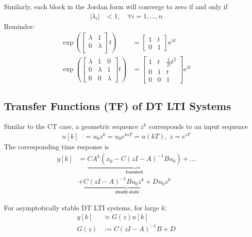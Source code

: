 Similarly, each block in the Jordan form will converge to zero if and only if
\noindent\begin{align*}
    |\lambda_i| & <1,\quad\forall i=1,\ldots,n
\end{align*}
Reminder:
\noindent\begin{align*}
    \left.\exp\left(\begin{bmatrix}\lambda&1\\ 0&\lambda\\\end{bmatrix}\right.t\right)               & =\begin{bmatrix}1&t\\0&1\end{bmatrix}\text{e}^{\lambda t}                          \\
    \left.\exp\left(\begin{bmatrix}\lambda&1&0\\0&\lambda&1\\0&0&\lambda\end{bmatrix}\right.t\right) & =\begin{bmatrix}1&t&\frac{1}{2!}t^2\\0&1&t\\0&0&1\end{bmatrix}\text{e}^{\lambda t}
\end{align*}
%
\subsection{Transfer Functions (TF) of DT LTI Systems}

Similar to the CT case, a geometric sequence $z^k$ corresponds to an input sequence
\noindent\begin{align*}
    u[k] & =u_0z^k=u_0e^{ksT}=u(kT), \; z=e^{sT}
\end{align*}
The corresponding time response is
\noindent\begin{align*}
    y[k] & = \underbrace{CA^k(x_0-C{(zI-A)}^{-1}Bu_0)}_{\textsf{transient}}+\dots \\
         & +\underbrace{C{(zI-A)}^{-1}Bu_0z^k+Du_0z^k}_{\textsf{steady-state}}
\end{align*}

For asymptotically stable DT LTI systems, for large $k$:
\noindent\begin{align*}
    y[k] & \approx G(z)u[k]    \\
    G(z) & :=C{(zI-A)}^{-1}B+D
\end{align*}
